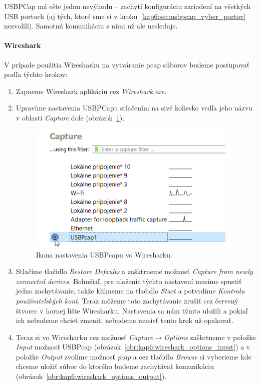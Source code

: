 USBPCap má ešte jednu nevýhodu -- zachytí konfiguráciu zariadení na všetkých USB portoch (aj tých, ktoré sme si v kroku~\ref{kap6:sec:usbpcap_vyber_portov} nezvolili). Samotnú komunikáciu s nimi už ale nesleduje.

\paragraph{Wireshark}
\label{kap6:sec:wireshark:file_capture}
\hfill\break
V prípade použitia Wiresharku na vytváranie pcap súborov budeme postupovať podľa týchto krokov:
\begin{enumerate}
\item Zapneme Wireshark aplikáciu cez \textit{Wireshark.exe}.
\item Upravíme nastavenia USBPCapu stlačením na sivé koliesko vedľa jeho náz\-vu v oblasti \textit{Capture} dole (obrázok~\ref{obr:kap6:wireshark_usbpcap_settings}).

\begin{figure}[!htb]
	\centering
	\includegraphics[width=10cm]{img/kap06_wireshark_usbpcap_settings}
	\caption{Ikona nastavenia USBPcapu vo Wiresharku.}
	\label{obr:kap6:wireshark_usbpcap_settings}
\end{figure}

\item Stlačíme tlačidlo \textit{Restore Defaults} a zašktrneme možnosť \textit{Capture from newly connected devices}. Bohužiaľ, pre uloženie týchto nastavení musíme spustiť jedno zachytávanie, takže klikneme na tlačidlo \textit{Start} a potvrdíme \textit{Kontrolu používateľských kont}. Teraz môžeme toto zachytávanie zrušiť cez červený štvorec v hornej lište Wiresharku. Nastavenia sa nám týmto uložili a pokiaľ ich nebudeme chcieť zmeniť, nebudeme musieť tento krok už opakovať.
\item Teraz si vo Wiresharku cez možnosť \textit{Capture}$\rightarrow$\textit{Options} zaškrtneme v položke \textit{Input} možnosť USBPcap (obrázok~\ref{obr:kap6:wireshark_options_input}) a v položke \textit{Output} zvolíme možnosť \textit{pcap} a cez tlačidlo \textit{Browse} si vyberieme kde chceme uložiť súbor do ktorého budeme zachytávať komunikáciu (obrázok~\ref{obr:kap6:wireshark_options_output}).


\end{enumerate}
